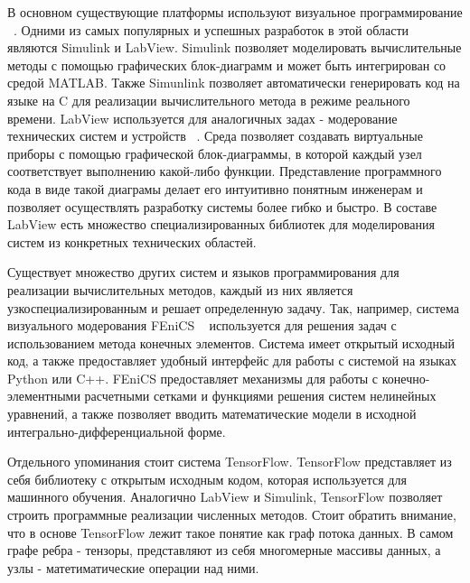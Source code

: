 В основном существующие платформы используют визуальное программирование ~\cite{CSEComputationalSteering}. Одними из самых популярных и успешных разработок в этой области являются Simulink и LabView. Simulink позволяет моделировать вычислительные методы с помощью графических блок-диаграмм и может быть интегрирован со средой MATLAB. Также Simunlink позволяет автоматически генерировать код на языке на C для реализации вычислительного метода в режиме реального времени. LabView используется для аналогичных задах - модерование технических систем и устройств ~\cite{LabViewUsage}. Среда позволяет создавать виртуальные приборы с помощью графической блок-диаграммы, в которой каждый узел соответствует выполнению какой-либо функции. Представление программного кода в виде такой диаграмы делает его интуитивно понятным инженерам и позволяет осуществлять разработку системы более гибко и быстро. В составе LabView есть множество специализированных библиотек для моделирования систем из конкретных технических областей.

Существует множество других систем и языков программирования для реализации вычислительных методов, каждый из них является узкоспециализированным и решает определенную задачу. Так, например, система визуального модерования FEniCS ~\cite{FEniCSFramework} используется для решения задач с использованием метода конечных элементов. Система имеет открытый исходный код, а также предоставляет удобный интерфейс для работы с системой на языках Python или C++. FEniCS предоставляет механизмы для работы с конечно-элементными расчетными сетками и функциями решения систем нелинейных уравнений, а также позволяет вводить математические модели в исходной интегрально-дифференциальной форме.

Отдельного упоминания стоит система TensorFlow. TensorFlow представляет из себя библиотеку с открытым исходным кодом, которая используется для машинного обучения. Аналогично LabView и Simulink, TensorFlow позволяет строить программные реализации численных методов. Стоит обратить внимание, что в основе TensorFlow лежит такое понятие как граф потока данных. В самом графе ребра - тензоры, представляют из себя многомерные массивы данных, а узлы - матетиматические операции над ними.

